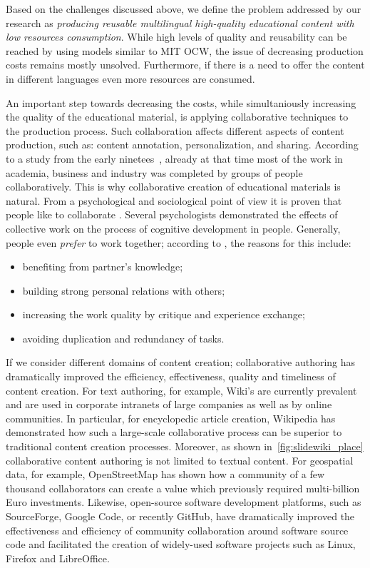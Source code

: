 \documentclass[ngerman,UKenglish,table]{scrbook}
\begin{document}
Based on the challenges discussed above, we define the problem addressed by our research as \emph{producing reusable multilingual high-quality educational content with low resources consumption}.
While high levels of quality and reusability can be reached by using models similar to MIT OCW, the issue of decreasing production costs remains mostly unsolved.
Furthermore, if there is a need to offer the content in different languages even more resources are consumed.

An important step towards decreasing the costs, while simultaniously increasing the quality of the educational material, is applying collaborative techniques to the production process.
Such collaboration affects different aspects of content production, such as: content annotation, personalization, and sharing.
According to a study from the early ninetees~\cite{posner1992people}, already at that time most of the work in academia, business and industry was completed by groups of people collaboratively.
This is why collaborative creation of educational materials is natural.
From a psychological and sociological point of view it is proven that people like to collaborate \cite{smith1995cooperative, Halimi2011}.
Several psychologists demonstrated the effects of collective work on the process of cognitive development in people.
Generally, people even \emph{prefer} to work together; 
according to \cite{smith1995cooperative, Halimi2011}, the reasons for this include:

\begin{itemize}
\item benefiting from partner's knowledge;
\item building strong personal relations with others;
\item increasing the work quality by critique and experience exchange;
\item avoiding duplication and redundancy of tasks.
\end{itemize}

If we consider different domains of content creation; collaborative authoring has dramatically improved the efficiency, effectiveness, quality and timeliness of content creation.
For text authoring, for example, Wiki’s are currently prevalent and are used in corporate intranets of large companies as well as by online communities.
In particular, for encyclopedic article creation, Wikipedia has demonstrated how such a large-scale collaborative process can be superior to traditional content creation processes.
Moreover, as shown in~\autoref{fig:slidewiki_place} collaborative content authoring is not limited to textual content.
For geospatial data, for example, OpenStreetMap has shown how a community of a few thousand collaborators can create a value which previously required multi-billion Euro investments.
Likewise, open-source software development platforms, such as SourceForge, Google Code, or recently GitHub, have dramatically improved the effectiveness and efficiency of community collaboration around software source code and facilitated the creation of widely-used software projects such as Linux, Firefox and LibreOffice.
\end{document}
